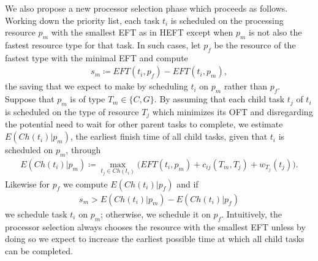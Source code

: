 \documentclass[runningheads]{llncs}
\begin{document}
We also propose a new processor selection phase which proceeds as follows. Working down the priority list, each task $t_i$ is scheduled on the processing resource $p_{m}$ with the smallest EFT as in HEFT except when $p_m$ is not also the fastest resource type for that task. In such cases, let $p_f$ be the resource of the fastest type with the minimal EFT and compute 
\begin{align}
\label{eq.sm}
s_m \coloneqq EFT(t_i, p_f) - EFT(t_i, p_m),
\end{align}
the saving that we expect to make by scheduling $t_i$ on $p_m$ rather than $p_f$. Suppose that $p_m$ is of type $T_m \in \{C, G\}$. By assuming that each child task $t_j$ of $t_i$ is scheduled on the type of resource $T_j$ which minimizes its OFT and disregarding the potential need to wait for other parent tasks to complete, we estimate $E(Ch(t_i) | p_m)$, the earliest finish time of all child tasks, given that $t_i$ is scheduled on $p_m$, through
\begin{align}
\label{eq.oft_children}
E(Ch(t_i) | p_m) \coloneqq \max_{t_j \in Ch(t_i)} \Big( EFT(t_i, p_m) + c_{ij}(T_m, T_j) + w_{T_j}(t_j)\Big).
\end{align}
Likewise for $p_f$ we compute $E(Ch(t_i) | p_f)$ and if
\begin{align}
\label{eq.cross_condition}
s_m > E(Ch(t_i) | p_m) - E(Ch(t_i) | p_f)
\end{align}
we schedule task $t_i$ on $p_m$; otherwise, we schedule it on $p_f$. Intuitively, the processor selection always chooses the resource with the smallest EFT unless by doing so we expect to increase the earliest possible time at which all child tasks can be completed.
\end{document}
